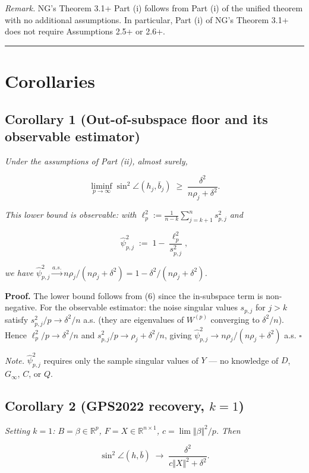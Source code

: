 \documentclass{article}
\theoremstyle{remark}
\begin{document}
\textit{Remark.} NG's Theorem 3.1+ Part (i) follows from Part (i) of the unified theorem with no additional assumptions. In particular, Part (i) of NG's Theorem 3.1+ does not require Assumptions 2.5+ or 2.6+.

\medskip\noindent\rule{\linewidth}{0.4pt}\medskip

\section{Corollaries}

\subsection{Corollary 1 (Out-of-subspace floor and its observable estimator)}

\textit{Under the assumptions of Part (ii), almost surely,}

\[
\liminf_{p\to\infty}\sin^2\angle(h_j,\bar{b}_j) \;\ge\; \frac{\delta^2}{n\rho_j+\delta^2}.
\]

\textit{This lower bound is observable: with $\ell_p^2 := \frac{1}{n-k}\sum_{j=k+1}^n s_{p,j}^2$ and}

\[
\hat{\psi}_{p,j}^2 \;:=\; 1 - \frac{\ell_p^2}{s_{p,j}^2},
\]

\textit{we have $\hat{\psi}_{p,j}^2 \xrightarrow{a.s.} n\rho_j/(n\rho_j+\delta^2) = 1 - \delta^2/(n\rho_j+\delta^2)$.}

\textbf{Proof.} The lower bound follows from (6) since the in-subspace term is non-negative. For the observable estimator: the noise singular values $s_{p,j}$ for $j > k$ satisfy $s_{p,j}^2/p\to\delta^2/n$ a.s. (they are eigenvalues of $W^{(p)}$ converging to $\delta^2/n$). Hence $\ell_p^2/p\to\delta^2/n$ and $s_{p,j}^2/p\to\rho_j+\delta^2/n$, giving $\hat{\psi}_{p,j}^2\to n\rho_j/(n\rho_j+\delta^2)$ a.s. $\square$

\textit{Note.} $\hat{\psi}_{p,j}^2$ requires only the sample singular values of $Y$ — no knowledge of $D$, $G_\infty$, $C$, or $Q$.

\subsection{Corollary 2 (GPS2022 recovery, $k=1$)}

\textit{Setting $k=1$: $B = \beta\in\mathbb{R}^p$, $F = X\in\mathbb{R}^{n\times 1}$, $c = \lim\Vert \beta\Vert^2/p$. Then}

\[
\sin^2\angle(h, \bar{b}) \;\to\; \frac{\delta^2}{c\Vert X\Vert^2 + \delta^2}.
\]
\end{document}
